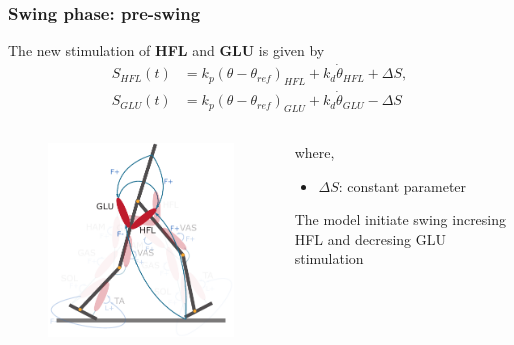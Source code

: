 \documentclass[10pt]{beamer}
\begin{document}
\begin{frame}
	\frametitle{Swing phase: pre-swing}
	\begin{block}{}
		The new stimulation of \textbf{HFL} and \textbf{GLU} is given by
		\begin{align*}
			S_{HFL}(t)&=  k_p (\theta-\theta_{ref})_{HFL} + k_d \dot{\theta}_{HFL} + \Delta S,  \\
			S_{GLU}(t)&=  k_p (\theta-\theta_{ref})_{GLU} + k_d \dot{\theta}_{GLU} - \Delta S
		\end{align*}
	\end{block}
	
	\begin{columns}
		\begin{column}{.5\textwidth}
			\begin{figure}
				\centering
				\includegraphics[width=.5\textheight]{images/new_model/swing/muscle_pre_glu.pdf}
			\end{figure}
		\end{column}
		\begin{column}{.5\textwidth}
			where,
			\begin{itemize}
				\item $\Delta S$: constant parameter
			\end{itemize}
			\begin{exampleblock}{}
				The model initiate swing incresing HFL and decresing GLU stimulation
			\end{exampleblock}		
		\end{column}
	\end{columns}	
\end{frame}
\end{document}
